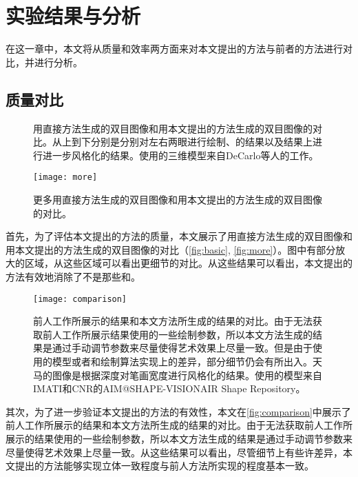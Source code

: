 \chapter{实验结果与分析}

在这一章中，本文将从质量和效率两方面来对本文提出的方法与前者的方法进行对比，并进行分析。

\section{质量对比}

\begin{figure}[tbh]
    \centering
    \caption{\label{fig:basic}
    用直接方法生成的双目图像和用本文提出的方法生成的双目图像的对比。从上到下分别是分别对左右两眼进行绘制、\stc{}的结果以及\stc{}结果上进行进一步风格化的结果。使用的三维模型来自DeCarlo等人的工作\cite{DFRS03}。
    }
\end{figure}
  
\begin{figure}[tbh]
    \centering
    \texttt{[image: more]}
    \caption{\label{fig:more}
    更多用直接方法生成的双目图像和用本文提出的方法生成的双目图像的对比。
    }
\end{figure}

首先，为了评估本文提出的方法的质量，本文展示了用直接方法生成的双目图像和用本文提出的方法生成的双目图像的对比（\autoref{fig:basic}, \autoref{fig:more}）。图中有部分放大的区域，从这些区域可以看出更细节的对比。从这些结果可以看出，本文提出的方法有效地消除了不是\stc{}那些\con{}和\scon{}。

\begin{figure}[tbh]
    \centering
    \texttt{[image: comparison]}
    \caption{\label{fig:comparison}
    前人工作\cite{kim2013stereoscopic,bukenberger2018stereo}所展示的结果和本文方法所生成的结果的对比。由于无法获取前人工作所展示结果使用的一些绘制参数，所以本文方法生成的结果是通过手动调节参数来尽量使得艺术效果上尽量一致。但是由于使用的模型或者\con{}和\scon{}绘制算法实现上的差异，部分细节仍会有所出入。天马的图像是根据深度对笔画宽度进行风格化的结果。使用的模型来自IMATI和CNR的AIM@SHAPE-VISIONAIR Shape Repository\cite{INR04}。}
\end{figure}  

其次，为了进一步验证本文提出的方法的有效性，本文在\autoref{fig:comparison}中展示了前人工作\cite{kim2013stereoscopic,bukenberger2018stereo}所展示的结果和本文方法所生成的结果的对比。由于无法获取前人工作所展示的结果使用的一些绘制参数，所以本文方法生成的结果是通过手动调节参数来尽量使得艺术效果上尽量一致。从这些结果可以看出，尽管细节上有些许差异，本文提出的方法能够实现立体一致程度与前人方法所实现的程度基本一致。

